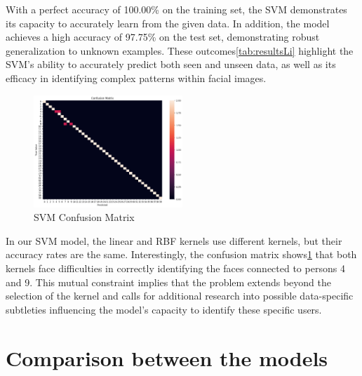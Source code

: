 \documentclass[12pt,a4paper,twocolumn]{article}
\begin{document}
With a perfect accuracy of 100.00\% on the training set, the SVM demonstrates its capacity to accurately learn from the given data. In addition, the model achieves a high accuracy of 97.75\% on the test set, demonstrating robust generalization to unknown examples. These outcomes\ref{tab:resultsLi} highlight the SVM's ability to accurately predict both seen and unseen data, as well as its efficacy in identifying complex patterns within facial images.


\begin{figure}[ht!]
\centering
\includegraphics[width=0.5\textwidth]{images2/cmLinear.png}

\caption{\label{fig:CMLi} SVM Confusion Matrix}
\end{figure}

In our SVM model, the linear and RBF kernels use different kernels, but their accuracy rates are the same. Interestingly, the confusion matrix shows\ref{fig:CMLi} that both kernels face difficulties in correctly identifying the faces connected to persons 4 and 9. This mutual constraint implies that the problem extends beyond the selection of the kernel and calls for additional research into possible data-specific subtleties influencing the model's capacity to identify these specific users. 

\section{Comparison between the models}
\end{document}
